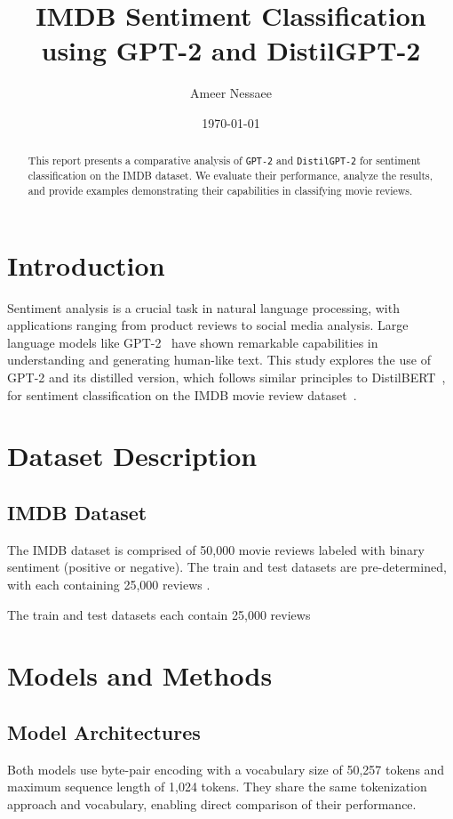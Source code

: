 \documentclass[11pt]{article}
\title{IMDB Sentiment Classification using GPT-2 and DistilGPT-2}
\author{Ameer Nessaee}
\date{\today}
\newcommand{\modelname}[1]{\texttt{#1}}
\begin{document}
\maketitle

\begin{abstract}
This report presents a comparative analysis of \modelname{GPT-2} and \modelname{DistilGPT-2} for sentiment classification on the IMDB dataset. We evaluate their performance, analyze the results, and provide examples demonstrating their capabilities in classifying movie reviews.
\end{abstract}

\section{Introduction}
Sentiment analysis is a crucial task in natural language processing, with applications ranging from product reviews to social media analysis. 
Large language models like GPT-2~\cite{gpt2} have shown remarkable capabilities in understanding and generating human-like text. 
This study explores the use of GPT-2 and its distilled version, which follows similar principles to DistilBERT~\cite{distilbert}, 
for sentiment classification on the IMDB movie review dataset~\cite{imdb}.

\section{Dataset Description}
\subsection{IMDB Dataset}
The IMDB dataset is comprised of 50,000 movie reviews labeled with binary sentiment (positive or negative). 
The train and test datasets are pre-determined, with each containing 25,000 reviews \cite{imdb}.


The train and test datasets each contain 25,000 reviews


\section{Models and Methods}

\subsection{Model Architectures}
Both models use byte-pair encoding with a vocabulary size of 50,257 tokens and maximum sequence length of 1,024 tokens. They share the same tokenization approach and vocabulary, enabling direct comparison of their performance.
\end{document}
